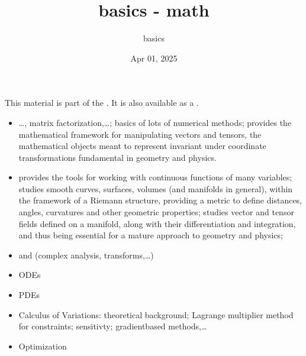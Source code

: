 \documentclass[letterpaper,10pt,english]{jupyterBook}
\title{basics - math}
\date{Apr 01, 2025}
\author{basics}
\begin{document}
\pagestyle{empty}
\sphinxmaketitle
\pagestyle{plain}
\sphinxtableofcontents
\pagestyle{normal}
\label{\detokenize{intro::doc}}


\sphinxAtStartPar
This material is part of the . It is also available as a .

\sphinxAtStartPar
{}
\begin{itemize}
\item {} 
\sphinxAtStartPar
{} …, matrix factorization,…; basics of lots of numerical methods;  provides the mathematical framework for manipulating vectors and tensors, the mathematical objects meant to represent  \sphinxhyphen{} invariant under coordinate transformations \sphinxhyphen{} fundamental in geometry and physics.

\item {} 
\sphinxAtStartPar
{} provides the tools for working with continuous functions of many variables;  studies smooth curves, surfaces, volumes (and manifolds in general), within the framework of a Riemann structure, providing a metric to define distances, angles, curvatures and other geometric properties;  studies vector and tensor fields defined on a manifold, along with their differentiation and integration, and thus being essential for a mature approach to geometry and physics;

\item {} 
\sphinxAtStartPar
{} and  (complex analysis, transforms,…)

\item {} 
\sphinxAtStartPar
ODEs

\item {} 
\sphinxAtStartPar
PDEs

\item {} 
\sphinxAtStartPar
Calculus of Variations: theoretical background; Lagrange multiplier method for constraints; sensitivty; gradient\sphinxhyphen{}based methods,…

\item {} 
\sphinxAtStartPar
Optimization

\end{itemize}
\end{document}
